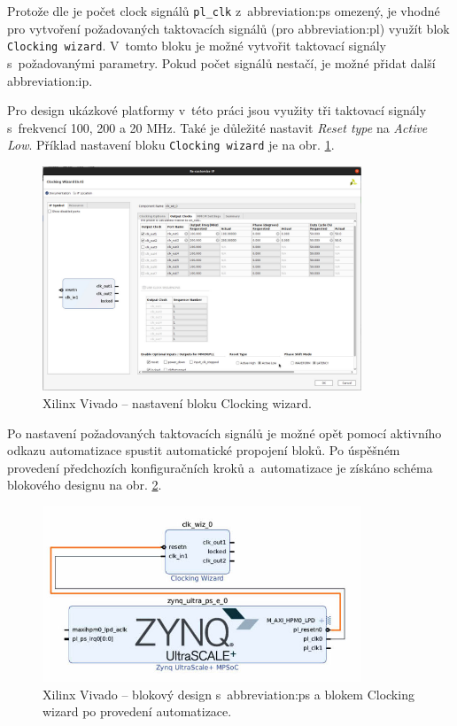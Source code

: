 \documentclass[a4paper, twoside, 11pt]{article}
\begin{document}
				Protože dle \cite{xilinx-github-vitis-tutorials-step-1-create-the-vivado-hardware-design-and-generate-xsa} je počet clock signálů \texttt{pl\_clk} z~\gls{abbreviation:ps} omezený, je vhodné pro vytvoření požadovaných taktovacích signálů (pro \gls{abbreviation:pl}) využít blok \texttt{Clocking wizard}. V~tomto bloku je možné vytvořit taktovací signály s~požadovanými parametry. Pokud počet signálů nestačí, je možné přidat další \gls{abbreviation:ip}.\par
				Pro design ukázkové platformy v~této práci jsou využity tři taktovací signály s~frekvencí 100, 200 a 20 MHz. Také je důležité nastavit \textit{Reset type} na \textit{Active Low}. Příklad nastavení bloku \texttt{Clocking wizard} je na obr. \ref{fig:kr26-xilix-vivado-flow-07}.\par

				\begin{figure}[htbp!]
					\centering
					\includegraphics[width=0.85\textwidth]{src/png/kr26-xilinx-vivado-flow/kr26-xilix-vivado-flow-07.jpg}
					\caption{Xilinx Vivado – nastavení bloku Clocking wizard.}
					\label{fig:kr26-xilix-vivado-flow-07}
				\end{figure}
				Po nastavení požadovaných taktovacích signálů je možné opět pomocí aktivního odkazu automatizace spustit automatické propojení bloků. Po úspěšném provedení předchozích konfiguračních kroků a~automatizace je získáno schéma blokového designu na obr. \ref{fig:kr26-xilix-vivado-flow-08}.

				\begin{figure}[htbp!]
					\centering
					\includegraphics[width=0.85\textwidth]{src/png/kr26-xilinx-vivado-flow/kr26-xilix-vivado-flow-08.jpg}
					\caption{Xilinx Vivado – blokový design s~\gls{abbreviation:ps} a blokem Clocking wizard po provedení automatizace.}
					\label{fig:kr26-xilix-vivado-flow-08}
				\end{figure}
\end{document}
